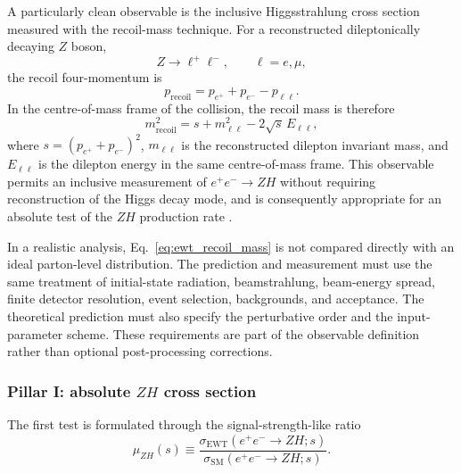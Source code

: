 \documentclass[10pt,a4paper]{article}
\begin{document}
A particularly clean observable is the inclusive Higgsstrahlung cross section measured with the recoil-mass technique. For a reconstructed dileptonically decaying $Z$ boson,
\begin{equation}
	Z\to \ell^+\ell^- ,
	\qquad \ell=e,\mu,
\end{equation}
the recoil four-momentum is
\begin{equation}
	p_{\mathrm{recoil}}
	=p_{e^+}+p_{e^-}-p_{\ell\ell}.
\end{equation}
In the centre-of-mass frame of the collision, the recoil mass is therefore
\begin{equation}
	m_{\mathrm{recoil}}^2
	=s+m_{\ell\ell}^2-2\sqrt{s}\,E_{\ell\ell},
	\label{eq:ewt_recoil_mass}
\end{equation}
where $s=(p_{e^+}+p_{e^-})^2$, $m_{\ell\ell}$ is the reconstructed dilepton invariant mass, and $E_{\ell\ell}$ is the dilepton energy in the same centre-of-mass frame. This observable permits an inclusive measurement of $e^+e^-\to ZH$ without requiring reconstruction of the Higgs decay mode, and is consequently appropriate for an absolute test of the $ZH$ production rate \cite{Thomson2015,Fujii2017,Chen2016}.

In a realistic analysis, Eq.~\eqref{eq:ewt_recoil_mass} is not compared directly with an ideal parton-level distribution. The prediction and measurement must use the same treatment of initial-state radiation, beamstrahlung, beam-energy spread, finite detector resolution, event selection, backgrounds, and acceptance. The theoretical prediction must also specify the perturbative order and the input-parameter scheme. These requirements are part of the observable definition rather than optional post-processing corrections.

\subsubsection{Pillar I: absolute $ZH$ cross section}
\label{sec:ewt_pillar_one}

The first test is formulated through the signal-strength-like ratio
\begin{equation}
	\mu_{ZH}(s)
	\equiv
	\frac{\sigma_{\mathrm{EWT}}(e^+e^-\to ZH;s)}
	{\sigma_{\mathrm{SM}}(e^+e^-\to ZH;s)}.
	\label{eq:ewt_muzh_definition}
\end{equation}
\end{document}
